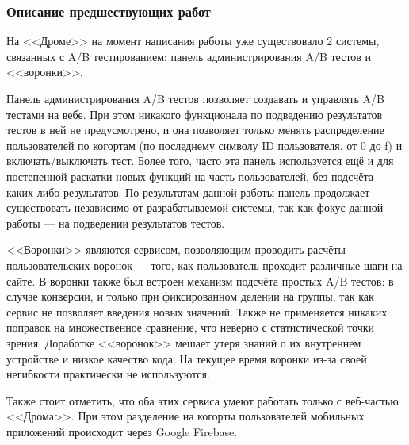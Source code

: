 \documentclass[../document.tex]{subfiles}
\begin{document}
	\subsubsection{Описание предшествующих работ}
	\par На <<Дроме>> на момент написания работы уже существовало 2 системы, связанных с A/B тестированием: панель администрирования A/B тестов и <<воронки>>.
	\par Панель администрирования A/B тестов позволяет создавать и управлять A/B тестами на вебе. При этом никакого функционала по подведению результатов тестов в ней не предусмотрено, и она позволяет только менять распределение пользователей по когортам (по последнему символу ID пользователя, от 0 до f) и включать/выключать тест. Более того, часто эта панель используется ещё и для постепенной раскатки новых функций на часть пользователей, без подсчёта каких-либо результатов. По результатам данной работы панель продолжает существовать независимо от разрабатываемой системы, так как фокус данной работы --- на подведении результатов тестов.
	\par <<Воронки>> являются сервисом, позволяющим проводить расчёты пользовательских воронок --- того, как пользователь проходит различные шаги на сайте. В воронки также был встроен механизм подсчёта простых A/B тестов: в случае конверсии, и только при фиксированном делении на группы, так как сервис не позволяет введения новых значений. Также не применяется никаких поправок на множественное сравнение, что неверно с статистической точки зрения. Доработке <<воронок>> мешает утеря знаний о их внутреннем устройстве и низкое качество кода. На текущее время воронки из-за своей негибкости практически не используются.
	\par Также стоит отметить, что оба этих сервиса умеют работать только с веб-частью <<Дрома>>. При этом разделение на когорты пользователей мобильных приложений происходит через Google Firebase.
\end{document}
